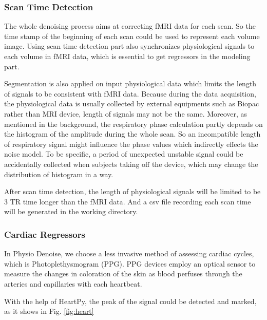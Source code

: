 \subsubsection{Scan Time Detection}
The whole denoising process aims at correcting fMRI data for each scan. 
So the time stamp of the beginning of each scan could be used to represent each volume image. 
Using scan time detection part also synchronizes physiological signals to each volume in fMRI data,
which is essential to get regressors in the modeling part.

Segmentation is also applied on input physiological data which
limits the length of signals to be consistent with fMRI data. 
Because during the data acquisition, the physiological
data is usually collected by external equipments such as Biopac rather than MRI device, 
length of signals may not be the same. Moreover, as mentioned in the background, the respiratory phase calculation 
partly depends on the histogram of the amplitude during the whole scan. So an incompatible length of 
respiratory signal might influence the phase values which indirectly effects the noise model. To be specific, 
a period of unexpected unstable signal could be accidentally collected when subjects taking off the 
device, which may change the distribution of histogram in a way.

After scan time detection, the length of physiological signals will be limited to be 3 TR time longer than the 
fMRI data. And a csv file recording each scan time will be generated in the working directory.

\subsubsection{Cardiac Regressors}

In Physio Denoise, we choose a less invasive method of assessing cardiac cycles, which is Photoplethysmogram (PPG). 
PPG devices employ an optical sensor to measure the changes in coloration of the skin as blood perfuses through the arteries and capillaries with each heartbeat. \cite{van2019heartpy}

With the help of HeartPy, the peak of the signal could be detected and marked, as it shows in Fig. \ref{fig:heart}

